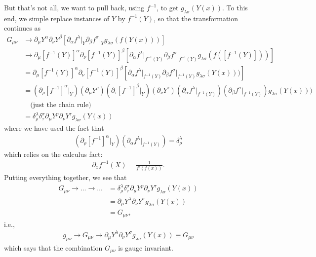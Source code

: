 \documentclass{book}
\theoremstyle{definition}
\newcommand{\p}{\partial}
\newcommand{\nn}{\nonumber}
\newcommand{\al}{\alpha}
\newcommand{\be}{\beta}
\newcommand{\f}[2]{\frac{#1}{#2}}
\newcommand{\lb}{\left[}
\newcommand{\rb}{\right]}
\begin{document}
But that's not all, we want to pull back, using $f^{-1}$, to get $g_{\lambda\sigma}(Y(x))$. To this end, we simple replace instances of $Y$ by $f^{-1}(Y)$, so that the transformation continues as
\begin{align}
G_{\mu\nu} &\to \p_\mu Y^\al \p_\nu Y^\be \lb \p_\al f^\lambda\vert_Y \p_\beta f^\sigma\vert_Y g_{\lambda\sigma}(f(Y(x))) \rb\nn\\
&\to \p_\mu [f^{-1}(Y)]^\al \p_\nu [f^{-1}(Y)]^\be \lb \p_\al f^\lambda\vert_{f^{-1}(Y)} \p_\beta f^\sigma\vert_{f^{-1}(Y)} g_{\lambda\sigma}(f([f^{-1}(Y)])) \rb\nn\\
&= \p_\mu [f^{-1}(Y)]^\al \p_\nu [f^{-1}(Y)]^\be \lb \p_\al f^\lambda\vert_{f^{-1}(Y)} \p_\beta f^\sigma\vert_{f^{-1}(Y)} g_{\lambda\sigma}(Y(x))) \rb\nn\\
&= (\p_\rho [f^{-1}]^\al\vert_Y)( \p_\mu Y^\rho)( \p_\tau [f^{-1}]^\be\vert_Y)( \p_\nu Y^\tau) ( \p_\al f^\lambda\vert_{f^{-1}(Y)})( \p_\beta f^\sigma\vert_{f^{-1}(Y)}) g_{\lambda\sigma}(Y(x))) \nn\\
& \quad\text{(just the chain rule)}\nn\\
&= \delta^\lambda_\rho \delta^\sigma_\tau\p_\mu Y^\rho \p_\nu Y^\tau g_{\lambda\sigma}(Y(x))
\end{align}
where we have used the fact that 
\begin{align}
(\p_\rho [f^{-1}]^\al\vert_Y)( \p_\al f^\lambda\vert_{f^{-1}(Y)}) = \delta^\lambda_\rho
\end{align}
which relies on the calculus fact:
\begin{align}
\p_x f^{-1}(X) = \f{1}{f'(f(x))}.
\end{align}
Putting everything together, we see that
\begin{align}
G_{\mu\nu} \to \dots \to \dots &= \delta^\lambda_\rho \delta^\sigma_\tau\p_\mu Y^\rho \p_\nu Y^\tau g_{\lambda\sigma}(Y(x)) \nn\\
&=\p_\mu Y^\lambda \p_\nu Y^\sigma g_{\lambda\sigma}(Y(x)) \nn\\
&= G_{\mu\nu},
\end{align}
i.e.,
\begin{align}
\boxed{g_{\mu\nu} \to G_{\mu\nu} \to \p_\mu Y^\lambda \p_\nu Y^\sigma g_{\lambda\sigma}(Y(x)) \equiv G_{\mu\nu}}
\end{align}
which says that the combination $G_{\mu\nu}$ is gauge invariant. \\
\end{document}
